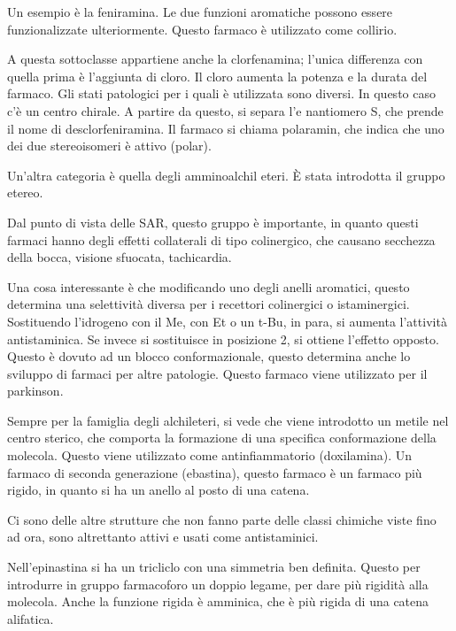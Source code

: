 Un esempio è la feniramina. Le due funzioni aromatiche possono essere
funzionalizzate ulteriormente. Questo farmaco è utilizzato come
collirio.

A questa sottoclasse appartiene anche la clorfenamina; l'unica
differenza con quella prima è l'aggiunta di cloro.
Il cloro aumenta la potenza e la durata del farmaco. Gli stati
patologici per i quali è utilizzata sono diversi.
In questo caso c'è un centro chirale.
A partire da questo, si separa l'e
nantiomero S, che prende il nome di
desclorfeniramina. Il farmaco si chiama polaramin, che indica che uno
dei due stereoisomeri è attivo (polar).


\clearpage

Un'altra categoria è quella degli amminoalchil eteri. È stata introdotta
il gruppo etereo.


Dal punto di vista delle SAR, questo gruppo è importante, in quanto
questi farmaci hanno degli effetti collaterali di tipo colinergico, che
causano secchezza della bocca, visione sfuocata, tachicardia.

Una cosa interessante è che modificando uno degli anelli aromatici,
questo determina una selettività diversa per i recettori colinergici o
istaminergici.
Sostituendo l'idrogeno con il Me, con Et o un t-Bu, in para, si aumenta
l'attività antistaminica.
Se invece si sostituisce in posizione 2, si ottiene l'effetto opposto.
Questo è dovuto ad un blocco conformazionale, questo determina anche lo
sviluppo di farmaci per altre patologie. Questo farmaco viene utilizzato
per il parkinson.


Sempre per la famiglia degli alchileteri, si vede che viene introdotto
un metile nel centro sterico, che comporta la formazione di una
specifica conformazione della molecola. Questo viene utilizzato come
antinfiammatorio (doxilamina).
Un farmaco di seconda generazione (ebastina), questo farmaco è un
farmaco più rigido, in quanto si ha un anello al posto di una catena.


Ci sono delle altre strutture che non fanno parte delle classi chimiche
viste fino ad ora, sono altrettanto attivi e usati come antistaminici.

Nell'epinastina si ha un tricliclo con una simmetria ben definita.
Questo per introdurre in gruppo farmacoforo un doppio legame, per dare
più rigidità alla molecola.
Anche la funzione rigida è amminica, che è più rigida di una catena
alifatica.

